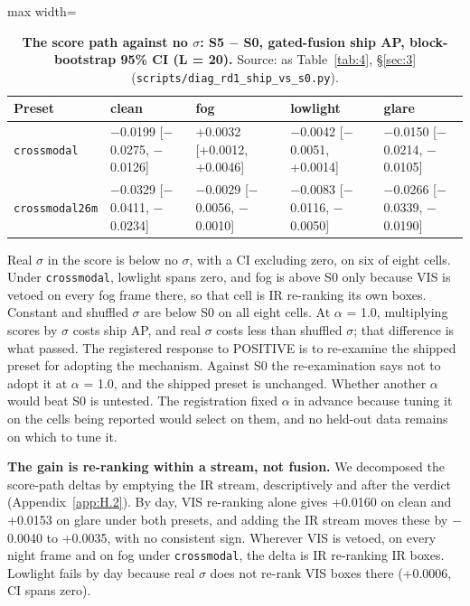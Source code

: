\documentclass[10pt]{article}
\begin{document}
\begin{table}[htbp]
\centering
\footnotesize
\caption{\textbf{The score path against no $\sigma$: S5 $-$ S0, gated-fusion ship AP, block-bootstrap 95\% CI (L = 20).} Source: as Table~\ref{tab:4}, \S\ref{sec:3} (\texttt{scripts/\allowbreak{}diag\_\allowbreak{}rd1\_\allowbreak{}ship\_\allowbreak{}vs\_\allowbreak{}s0.py}).}
\label{tab:4b}
\begin{adjustbox}{max width=\linewidth}
\begin{tabular}{lllll}
\toprule
Preset & clean & fog & lowlight & glare \\
\midrule
\texttt{crossmodal} & $-$0.0199 [$-$0.0275, $-$0.0126] & +0.0032 [+0.0012, +0.0046] & $-$0.0042 [$-$0.0051, +0.0014] & $-$0.0150 [$-$0.0214, $-$0.0105] \\
\texttt{crossmodal26m} & $-$0.0329 [$-$0.0411, $-$0.0234] & $-$0.0029 [$-$0.0056, $-$0.0010] & $-$0.0083 [$-$0.0116, $-$0.0050] & $-$0.0266 [$-$0.0339, $-$0.0190] \\
\bottomrule
\end{tabular}
\end{adjustbox}
\end{table}
Real $\sigma$ in the score is below no $\sigma$, with a CI excluding zero, on six of eight cells. Under \texttt{crossmodal}, lowlight spans zero, and fog is above S0 only because VIS is vetoed on every fog frame there, so that cell is IR re-ranking its own boxes. Constant and shuffled $\sigma$ are below S0 on all eight cells. At $\alpha$ = 1.0, multiplying scores by $\sigma$ costs ship AP, and real $\sigma$ costs less than shuffled $\sigma$; that difference is what passed. The registered response to POSITIVE is to re-examine the shipped preset for adopting the mechanism. Against S0 the re-examination says not to adopt it at $\alpha$ = 1.0, and the shipped preset is unchanged. Whether another $\alpha$ would beat S0 is untested. The registration fixed $\alpha$ in advance because tuning it on the cells being reported would select on them, and no held-out data remains on which to tune it.

\textbf{The gain is re-ranking within a stream, not fusion.} We decomposed the score-path deltas by emptying the IR stream, descriptively and after the verdict (Appendix~\ref{app:H.2}). By day, VIS re-ranking alone gives +0.0160 on clean and +0.0153 on glare under both presets, and adding the IR stream moves these by $-$0.0040 to +0.0035, with no consistent sign. Wherever VIS is vetoed, on every night frame and on fog under \texttt{crossmodal}, the delta is IR re-ranking IR boxes. Lowlight fails by day because real $\sigma$ does not re-rank VIS boxes there (+0.0006, CI spans zero).
\end{document}
